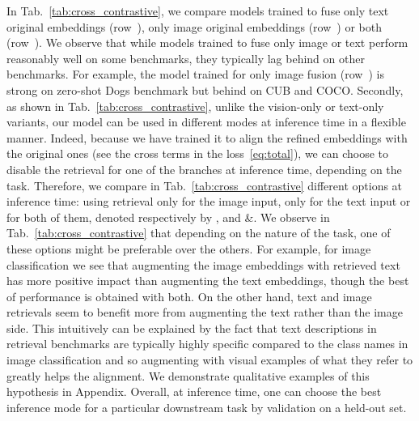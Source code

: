 In Tab.~\ref{tab:cross_contrastive}, we compare models trained to fuse only text original embeddings (row~), only image original embeddings (row~) or both (row~).
We observe that while models trained to fuse only image or text perform reasonably well on some benchmarks, they typically lag behind on other benchmarks.
For example, the model trained for only image fusion (row~) is strong on zero-shot Dogs benchmark but behind on CUB and COCO.
Secondly, as shown in Tab.~\ref{tab:cross_contrastive}, unlike the vision-only or text-only variants, our model can be used in different modes at inference time in a flexible manner.
Indeed, because we have trained it to align the refined embeddings with the original ones (see the cross terms in the loss~\ref{eq:total}), we can choose to disable the retrieval for one of the branches at inference time, depending on the task.
Therefore, we compare in Tab.~\ref{tab:cross_contrastive} different options at inference time: using retrieval only for the image input, only for the text input or for both of them, denoted respectively by ,  and \&.
We observe in Tab.~\ref{tab:cross_contrastive} that depending on the nature of the task, one of these options might be preferable over the others.
For example, for image classification we see that augmenting the image embeddings with retrieved text has more positive impact than augmenting the text embeddings, though the best of performance is obtained with both.
On the other hand, text and image retrievals seem to benefit more from augmenting the text rather than the image side.
This intuitively can be explained by the fact that text descriptions in retrieval benchmarks are typically highly specific compared to the class names in image classification and so augmenting with visual examples of what they refer to greatly helps the alignment.
We demonstrate qualitative examples of this hypothesis in Appendix.
Overall, at inference time, one can choose the best inference mode for a particular downstream task by validation on a held-out set.


